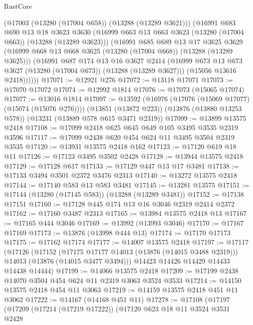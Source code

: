 \begin{lexlean}{RustCore}
\begin{coremodule}
        (@17003 (@13280 (@17004 @658)) (@13288 (@13289 @3621)))
        (@16991
          @683
          @690
          @13
          @18
          @3623
          @3630
          (@16999 @663 @13 @663 @3623 (@13280 (@17004 @663)) (@13288 (@13289 @3623)))
          (@16991
            @685
            @689
            @13
            @17
            @3625
            @3629
            (@16999 @668 @13 @668 @3625 (@13280 (@17004 @668)) (@13288 (@13289 @3625)))
            (@16991
              @687
              @174
              @13
              @16
              @3627
              @2414
              (@16999 @673 @13 @673 @3627 (@13280 (@17004 @673)) (@13288 (@13289 @3627)))
              (@15056 @13616 @2418))))))
@17071 := @12921 @276
@17072 := @13118 @17071
@17073 := @17070 @17072
@17074 := @12992 @1814
@17076 := @17073 (@15065 @17074)
@17077 := @13016 @1814
@17097 := @13592
    (@16976 (@17076 (@15069 @17077) (@15074 (@15076 @276))))
    (@13851 (@13872 @223))
    (@13876 (@13880 @13253 @578))
    (@13231 (@13889 @578 @615 @3471 @2319))
@17099 := @13899 @13575 @2418
@17108 := @17099 @2418 @625 @645 @649 @105 @3495 @3535 @2319 @3596
@17117 := @17099 @2438 @620 @454 @624 @11 @3495 @3504 @2319 @3535
@17120 := @13931 @13575 @2418 @162
@17123 := @17120 @619 @18 @11
@17126 := @17123 @3495 @3502 @2428
@17128 := @13944 @13575 @2418
@17129 := @17128 @617
@17133 := @17129 @447 @13 @17 @3481
@17138 := @17133 @3494 @3501 @2372 @3476 @2313
@17140 := @13272 @13575 @2418
@17144 := @17140 @583 @13 @583 @3481
@17145 := @13281 @13575
@17151 := @17144 (@13280 (@17145 @583)) (@13288 (@13289 @3481))
@17152 := @17138 @17151
@17160 := @17128 @445 @174 @13 @16 @3046 @2319 @2414 @2372
@17162 := @17160 @3487 @2313
@17165 := @13984 @13575 @2418 @13
@17167 := @17165 @444 @3046
@17169 := @13992 (@13993 @3046)
@17170 := @17167 @17169
@17173 := @13876 (@13998 @444 @13)
@17174 := @17170 @17173
@17175 := @17162 @17174
@17177 := @14007 @13575 @2418
@17197 := @17117
    (@17126
      (@17152
        (@17175 @17177 @14013 (@13876 (@14015 @3488 @2319)))
        @14013
        (@13876 (@14015 @3477 @3494)))
      @14423
      @14426
      @14429
      @14433
      @14438
      @14444)
@17199 := @14066 @13575 @2418
@17209 := @17199 @2438 @14070 @3504 @454 @624 @11 @2319 @3063 @3524 @3533
@17214 := @14150 @13575 @2418 @454 @11 @3063
@17219 := @14159 @13575 @2418 @451 @11 @3062
@17222 := @14167 (@14168 @451 @11)
@17278 := @17108
    (@17197
      (@17209
        (@17214 (@17219 @17222))
        (@17120
          @623
          @18
          @11
          @3524
          @3531
          @2428

\end{coremodule}
\end{lexlean}
